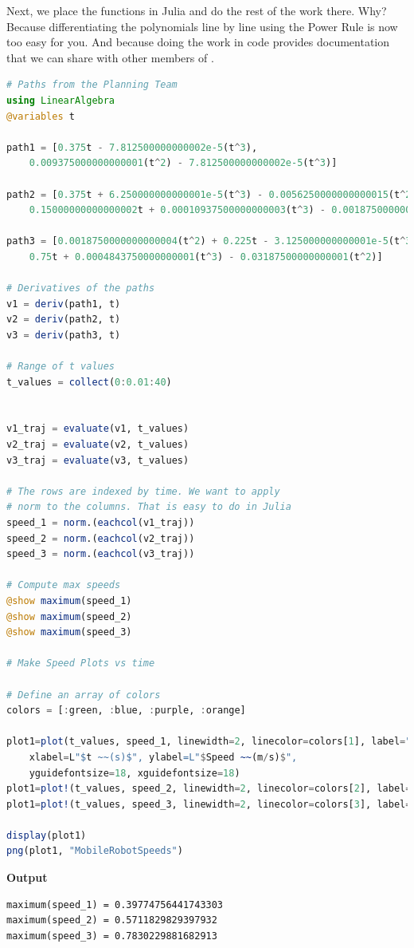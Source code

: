 Next, we place the functions in Julia and do the rest of the work there. Why? Because differentiating the polynomials line by line using the Power Rule is now too easy for you. And because doing the work in code provides documentation that we can share with other members of \company.


\begin{lstlisting}[language=Julia,style=mystyle]
# Paths from the Planning Team
using LinearAlgebra
@variables t

path1 = [0.375t - 7.812500000000002e-5(t^3), 
    0.009375000000000001(t^2) - 7.812500000000002e-5(t^3)]

path2 = [0.375t + 6.250000000000001e-5(t^3) - 0.0056250000000000015(t^2), 
    0.15000000000000002t + 0.00010937500000000003(t^3) - 0.0018750000000000004(t^2)]

path3 = [0.0018750000000000004(t^2) + 0.225t - 3.125000000000001e-5(t^3), 
    0.75t + 0.0004843750000000001(t^3) - 0.03187500000000001(t^2)]

# Derivatives of the paths
v1 = deriv(path1, t)
v2 = deriv(path2, t)
v3 = deriv(path3, t)

# Range of t values
t_values = collect(0:0.01:40)


v1_traj = evaluate(v1, t_values)
v2_traj = evaluate(v2, t_values)
v3_traj = evaluate(v3, t_values)

# The rows are indexed by time. We want to apply 
# norm to the columns. That is easy to do in Julia
speed_1 = norm.(eachcol(v1_traj))
speed_2 = norm.(eachcol(v2_traj))
speed_3 = norm.(eachcol(v3_traj))

# Compute max speeds
@show maximum(speed_1)
@show maximum(speed_2)
@show maximum(speed_3)

# Make Speed Plots vs time

# Define an array of colors
colors = [:green, :blue, :purple, :orange]  

plot1=plot(t_values, speed_1, linewidth=2, linecolor=colors[1], label="Speed 1", 
    xlabel=L"$t ~~(s)$", ylabel=L"$Speed ~~(m/s)$",
    yguidefontsize=18, xguidefontsize=18)
plot1=plot!(t_values, speed_2, linewidth=2, linecolor=colors[2], label="Speed 2")
plot1=plot!(t_values, speed_3, linewidth=2, linecolor=colors[3], label="Speed 3")

display(plot1)
png(plot1, "MobileRobotSpeeds")
\end{lstlisting}
\textbf{Output} 
\begin{verbatim}
maximum(speed_1) = 0.39774756441743303
maximum(speed_2) = 0.5711829829397932
maximum(speed_3) = 0.7830229881682913
\end{verbatim}

